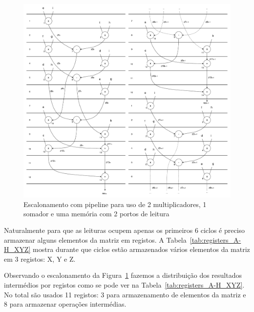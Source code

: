 \documentclass[a4paper]{article}
\begin{document}
\begin{figure}[h]
\centerline{\includegraphics[width=\paperwidth]{scheduling_2portRAM_pipelined_lessHW}}
\caption{Escalonamento com pipeline para uso de 2 multiplicadores, 1 somador e uma memória com 2 portos de leitura}
\label{fig:scheduling_2portRAM_pipelined_lessHW}
\end{figure}

Naturalmente para que as leituras ocupem apenas os primeiros 6 ciclos é preciso armazenar alguns elementos da matriz em registos. A Tabela~\ref{tab:registers_A-H_XYZ} mostra durante que ciclos estão armazenados vários elementos da matriz em 3 registos: X, Y e Z.

Observando o escalonamento da Figura~\ref{fig:scheduling_2portRAM_pipelined_lessHW} fazemos a distribuição dos resultados intermédios por registos como se pode ver na Tabela~\ref{tab:registers_A-H_XYZ}. No total são usados 11 registos: 3 para armazenamento de elementos da matriz e 8 para armazenar operações intermédias.
\end{document}
